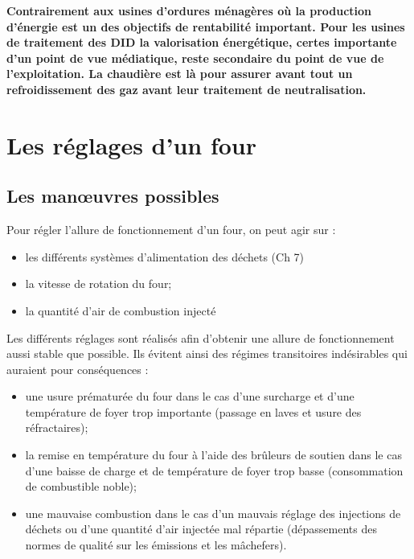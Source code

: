 
\textbf{Contrairement aux usines d’ordures ménagères où la production d’énergie est un des objectifs de rentabilité important. Pour les usines de traitement des DID la valorisation énergétique, certes importante d’un point de vue médiatique, reste secondaire du point de vue de l’exploitation. La chaudière est là pour assurer avant tout un refroidissement des gaz avant leur traitement de neutralisation.}


\section{Les réglages d’un four}


\subsection{Les manœuvres possibles}

Pour régler l’allure de fonctionnement d’un four, on peut agir sur :
\begin{itemize}
\item  les différents systèmes d’alimentation des déchets (Ch 7)
\item  la vitesse de rotation du four;
\item  la quantité d’air de combustion injecté

\end{itemize}



Les différents réglages sont réalisés afin d’obtenir une allure de fonctionnement aussi stable que possible. Ils évitent ainsi des régimes transitoires indésirables qui auraient pour conséquences :

\begin{itemize}
\item  une usure prématurée du four dans le cas d’une surcharge et d’une température de foyer trop importante (passage en laves et usure des réfractaires);
\item  la remise en température du four à l’aide des brûleurs de soutien dans le cas d’une baisse de charge et de température de foyer trop basse (consommation de combustible noble);
\item  une mauvaise combustion dans le cas d’un mauvais réglage des injections de déchets ou d’une quantité d’air injectée mal répartie (dépassements des normes de qualité sur les émissions et les mâchefers).

\end{itemize}

